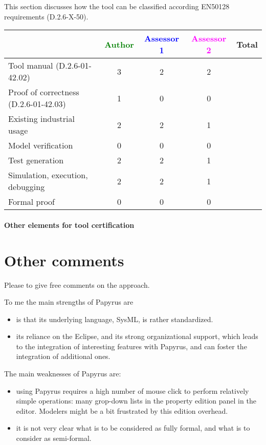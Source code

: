 This section discusses how the tool can be classified according EN50128 requirements (D.2.6-X-50).


\begin{tabular}{|l | c | c | c | c|}
\hline
& \textcolor{green}{Author} & \textcolor{blue}{Assessor 1} & \textcolor{magenta}{Assessor 2} & Total \\
\hline
Tool manual (D.2.6-01-42.02) & 3 & 2 & 2 & \\
\hline
Proof of correctness (D.2.6-01-42.03) & 1 & 0 & 0  & \\
\hline
Existing industrial usage & 2 & 2 & 1 & \\
\hline
Model verification & 0 & 0 & 0 & \\
\hline
Test generation & 2 & 2 & 1 & \\
\hline
Simulation, execution, debugging & 2 & 2 & 1 & \\
\hline
Formal proof & 0 & 0 & 0 & \\
\hline
\end{tabular}

\paragraph{Other elements for tool certification}

\section{Other comments}
Please to give free comments on the approach.

\begin{assessor1}
To me the main strengths of Papyrus are
\begin{itemize}
\item is that its underlying language, SysML, is rather standardized. 
\item its reliance on the Eclipse, and its strong organizational support, which leads to the integration of interesting features with Papyrus, and can foster the integration of additional ones. 
\end{itemize}

The main weaknesses of Papyrus are: 
\begin{itemize}
\item using Papyrus requires a high number of mouse click to perform relatively simple operations: many grop-down lists in the property edition panel in the editor. Modelers might be a bit frustrated by this edition overhead. 
\item it is not very clear what is to be considered as fully formal, and what is to consider as semi-formal.  
\end{itemize}
\end{assessor1}

